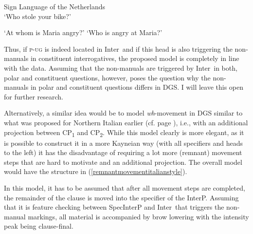 \begin{exe}
\ex Sign Language of the Netherlands \citep[111]{aboh2010sa} \\ 
\glt `Who stole your bike?' \label{ex:abohpfaupug} 

\ex\label{pugdgs}
\begin{xlist} 
\ex {}
\glt `At whom is Maria angry?' \label{ex:pugdgsa} 
\ex {}
\glt `Who is angry at Maria?' \label{ex:pugdgsb} 
\end{xlist}
\end{exe}

\noindent Thus, if \textsc{p-ug} is indeed located in Inter\textdegree\ and if this head is also triggering the non-manuals in constituent interrogatives, the proposed model is completely in line with the data. Assuming that the non-manuals are triggered by Inter\textdegree\ in both, polar and constituent questions, however, poses the question why the non-manuals in polar and constituent questions differs in DGS. I will leave this open for further research.   %

Alternatively, a similar idea would be to model \textit{wh}-movement in DGS similar to what was proposed for Northern Italian earlier (cf. page \pageref{italianwhdoublinga}), i.e., with an additional projection between CP\textsubscript{1} and CP\textsubscript{2}. While this model clearly is more elegant, as it is possible to construct it in a more Kayneian way (with all specifiers and heads to the left) it has the disadvantage of requiring a lot more (remnant) movement steps that are hard to motivate and an additional projection. The overall model would have the structure in (\ref{remnantmovementitalianstyle}).%

In this model, it has to be assumed that after all movement steps are completed, the remainder of the clause is moved into the specifier of the InterP. Assuming that it is feature checking between SpecInterP and Inter\textdegree\ that triggers the non-manual markings, all material is accompanied by brow lowering with the intensity peak being clause-final. 

